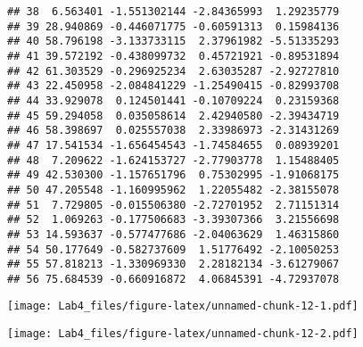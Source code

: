 \documentclass[
]{article}
\newenvironment{Shaded}{\begin{snugshade}}{\end{snugshade}}
\newcommand{\AttributeTok}[1]{\textcolor[rgb]{0.77,0.63,0.00}{#1}}
\newcommand{\CommentTok}[1]{\textcolor[rgb]{0.56,0.35,0.01}{\textit{#1}}}
\newcommand{\FunctionTok}[1]{\textcolor[rgb]{0.00,0.00,0.00}{#1}}
\newcommand{\NormalTok}[1]{#1}
\newcommand{\SpecialCharTok}[1]{\textcolor[rgb]{0.00,0.00,0.00}{#1}}
\newcommand{\StringTok}[1]{\textcolor[rgb]{0.31,0.60,0.02}{#1}}
\begin{document}
\begin{verbatim}
## 38  6.563401 -1.551302144 -2.84365993  1.29235779
## 39 28.940869 -0.446071775 -0.60591313  0.15984136
## 40 58.796198 -3.133733115  2.37961982 -5.51335293
## 41 39.572192 -0.438099732  0.45721921 -0.89531894
## 42 61.303529 -0.296925234  2.63035287 -2.92727810
## 43 22.450958 -2.084841229 -1.25490415 -0.82993708
## 44 33.929078  0.124501441 -0.10709224  0.23159368
## 45 59.294058  0.035058614  2.42940580 -2.39434719
## 46 58.398697  0.025557038  2.33986973 -2.31431269
## 47 17.541534 -1.656454543 -1.74584655  0.08939201
## 48  7.209622 -1.624153727 -2.77903778  1.15488405
## 49 42.530300 -1.157651796  0.75302995 -1.91068175
## 50 47.205548 -1.160995962  1.22055482 -2.38155078
## 51  7.729805 -0.015506380 -2.72701952  2.71151314
## 52  1.069263 -0.177506683 -3.39307366  3.21556698
## 53 14.593637 -0.577477686 -2.04063629  1.46315860
## 54 50.177649 -0.582737609  1.51776492 -2.10050253
## 55 57.818213 -1.330969330  2.28182134 -3.61279067
## 56 75.684539 -0.660916872  4.06845391 -4.72937078
\end{verbatim}

\begin{Shaded}
\end{Shaded}

\texttt{[image: Lab4\_files/figure-latex/unnamed-chunk-12-1.pdf]}

\begin{Shaded}
\end{Shaded}

\texttt{[image: Lab4\_files/figure-latex/unnamed-chunk-12-2.pdf]}
\end{document}
